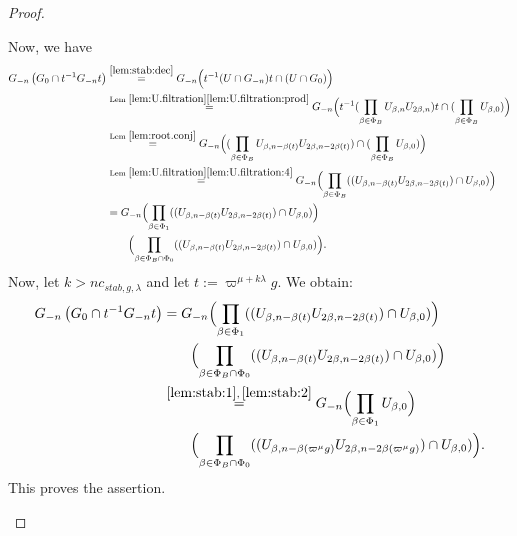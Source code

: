 \documentclass[12pt,a4paper]{amsart}%
\newcommand{\claude}[1]{{{#1}}}
\begin{document}
\begin{proof}
\begin{itemize}
{Now, we have 
\begin{align*}
 G_{-n}\left(G_{0}\cap  t^{-1} G_{-n} t \right)
&\overset{\eqref{lem:stab:dec}}{=}G_{-n} \Bigl({t^{-1}(U\cap G_{-n}) t}\cap (U \cap G_{0} )   \Bigr)\\
&\overset{\text{Lem }\ref{lem:U.filtration}\eqref{lem:U.filtration:prod}}{=}G_{-n} \Bigl({t^{-1}(\prod_{\beta\in\Phi_B}U_{\beta,n}U_{2\beta,n}) t}\cap (\prod_{\beta\in\Phi_B}U_{\beta,0} )\Bigr)\\
&\overset{\text{Lem }\ref{lem:root.conj}}{=}G_{-n} \Bigl({(\prod_{\beta\in\Phi_B}U_{\beta,n-\beta(t)}U_{2\beta,n-2\beta(t)})}\cap (\prod_{\beta\in\Phi_B}U_{\beta,0} )\Bigr)\\
&\overset{\text{Lem }\ref{lem:U.filtration} \eqref{lem:U.filtration:4}}{=}G_{-n} \Bigl({\prod_{\beta\in\Phi_B}((U_{\beta,n-\beta(t)}U_{2\beta,n-2\beta(t)})\cap U_{\beta,0}})\Bigr)\\
&=G_{-n} \Bigl({\prod_{\beta\in\Phi_1}((U_{\beta,n-\beta(t)}U_{2\beta,n-2\beta(t)})\cap U_{\beta,0}})\Bigr)\\
&\qquad\Bigl({\prod_{\beta\in\Phi_B\cap\Phi_0}((U_{\beta,n-\beta(t)}U_{2\beta,n-2\beta(t)})\cap U_{\beta,0}})\Bigr).
\end{align*}
Now, let $k>n c_{stab,g,\lambda}$ and let 
$t:=\varpi^{\mu+ k\lambda} g$. We \claude{obtain}:
\begin{align*}
G_{-n}\left(G_{0}\cap  t^{-1} G_{-n} t \right)
&=G_{-n} \Bigl({\prod_{\beta\in\Phi_1}((U_{\beta,n-\beta(t)}U_{2\beta,n-2\beta(t)})\cap U_{\beta,0}})\Bigr)\\
&\qquad\Bigl({\prod_{\beta\in\Phi_B\cap\Phi_0}((U_{\beta,n-\beta(t)}U_{2\beta,n-2\beta(t)})\cap U_{\beta,0}})\Bigr)\\
&\overset{\eqref{lem:stab:1},\,\eqref{lem:stab:2}}{=}G_{-n} \Bigl({\prod_{\beta\in\Phi_1}U_{\beta,0}}\Bigr)\\
&\qquad\Bigl({\prod_{\beta\in\Phi_B\cap\Phi_0}((U_{\beta,n-\beta(\varpi^\mu g)}U_{2\beta,n-2\beta(\varpi^\mu g)})\cap U_{\beta,0}})\Bigr).
\end{align*}
This proves the \claude{assertion}.
}

\end{itemize}
\end{proof}
\end{document}
